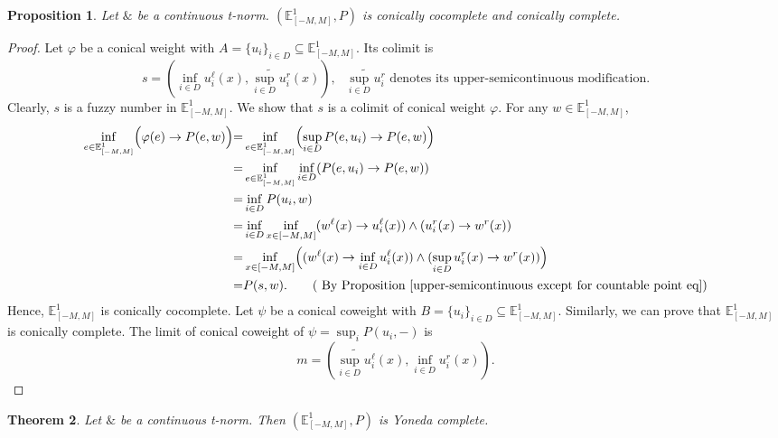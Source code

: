 \documentclass[preprint,3p,times]{elsarticle}
\theoremstyle{plain}
\newtheorem{thm}{Theorem}[section]
\newtheorem{prop}[thm]{Proposition}
\theoremstyle{definition}
\renewcommand{\phi}{\varphi}
\numberwithin{equation}{section}
\begin{document}
\begin{prop}\label{conically cocomplete and conically complete in E}
		Let $\&$ be a  continuous  t-norm. $(\mathbb{E}^1_{[-M,M]},P)$ is  conically cocomplete and  conically complete.
\end{prop}
\begin{proof}
	 Let \(\phi \) be a  conical weight  with \(A=\{u_i\}_{i\in D}\subseteq \mathbb{E}^1_{[-M,M]}\). Its colimit is \[ s=(\inf_{i\in D} u_i^\ell(x), \widetilde{\sup_{i\in D} u_i^r}(x) ), \text{ \(\widetilde{\sup_{i\in D} u_i^r}\) denotes its upper-semicontinuous modification}.\]
	 Clearly, \(s\) is a fuzzy number in \(\mathbb{E}^1_{[-M,M]}\).
	 We show that \(s\) is a colimit of  conical weight \(\phi\).
	 For any \(w\in\mathbb{E}^1_{[-M,M]}\),  
	 \begin{align*}
	 	\inf_{e\in \mathbb{E}^1_{[-M,M]}} \Bigl(\phi (e)\rightarrow P(e,w) \Bigl) =&\inf_{e\in \mathbb{E}^1_{[-M,M]}}  \Bigl(\sup_{i\in D} P(e,u_i) \rightarrow P(e,w)\Bigl) \\
	 	=& \inf_{e\in \mathbb{E}^1_{[-M,M]}} \inf_{i\in D} (P(e,u_i) \rightarrow P(e,w) )\\
	 	=& \inf_{i\in D} P(u_i,w) \\
	 	= &\inf_{i\in D} \inf_{x\in [-M,M]}( w^\ell(x)\rightarrow u_i^\ell(x))\wedge (u_i^r(x)\rightarrow w^r(x))  \\
	 	=& \inf_{x\in [-M,M]}\Bigl( ( w^\ell(x)\rightarrow  \inf_{i\in D}u^\ell_i(x) )\wedge (\sup_{i\in D}u_i^r(x)\rightarrow w^r(x) ) \Bigl)\\
	 	=&P(s,w). \tag{ By Proposition \ref{upper-semicontinuous except for countable point eq}}
	 \end{align*}
 Hence, \( \mathbb{E}^1_{[-M,M]}\) is conically cocomplete. Let \(\psi \) be a conical coweight with \(B=\{u_i\}_{i\in D}\subseteq \mathbb{E}^1_{[-M,M]} \).
 Similarly, we  can prove that \( \mathbb{E}^1_{[-M,M]}\) is conically complete. 
 The limit of conical coweight of \(\psi=\sup_{i}P(u_i,-)\) is \[ m=(\widetilde{\sup_{i\in D} u_i^\ell}(x), \inf_{i\in D} u_i^r(x) ).\] 
\end{proof}
\begin{thm}\label{Yoneda limit of P}
Let $\&$ be a  continuous t-norm. Then $(\mathbb{E}^1_{[-M,M]},P)$ is  Yoneda complete.    
\end{thm}
\end{document}
